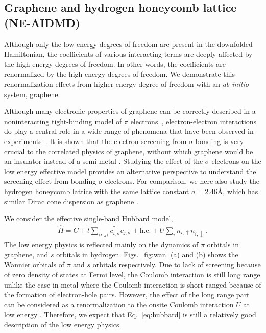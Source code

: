 %
\subsection{Graphene and hydrogen honeycomb lattice (NE-AIDMD)}
Although only the low energy degrees of freedom are present in the downfolded Hamiltonian, the coefficients of various interacting terms are deeply affected by the high energy degrees of freedom. In other words, the coefficients are renormalized by the high energy degrees of freedom. We demonstrate this renormalization effects from higher energy degree of freedom with an \textit{ab initio} system, graphene. 

Although many electronic properties of graphene can be correctly described in a noninteracting tight-binding model of $\pi$ electrons~\cite{Castro2009}, electron-electron interactions do play a central role in a wide range of phenomena that have been observed in experiments~\cite{Kotov2012}. It is shown that the electron screening from $\sigma$ bonding is very crucial to the correlated physics of graphene, without which graphene would be an insulator instead of a semi-metal \cite{Zheng2016}. Studying the effect of the $\sigma$ electrons on the low energy effective model provides an alternative perspective to understand the screening effect from bonding $\sigma$ electrons. For comparison, we here also study the hydrogen honeycomb lattice with the same lattice constant $a=2.46$\AA, which has similar Dirac cone dispersion as graphene \cite{Zheng2016}. 

 We consider the effective single-band Hubbard model, 
\begin{eqnarray}\label{eq:hubbard}
\hat{H} = C + t\sum_{\langle i,j\rangle}c_{i, \sigma}^\dagger c_{j, \sigma} + \text{h.c.} + U\sum_{i}n_{i, \uparrow}n_{i, \downarrow}\,. 
\end{eqnarray}
The low energy physics is reflected mainly on the dynamics of $\pi$ orbitals in graphene, and $s$ orbitals in hydrogen. Figs.~\ref{fig:wan} (a) and (b) shows the Wannier orbitals of $\pi$ and $s$ orbitals respectively. Due to lack of screening because of zero density of states at Fermi level, the Coulomb interaction is still long range unlike the case in metal where the Coulomb interaction is short ranged because of the formation of electron-hole pairs. However, the effect of the long range part can be considered as a renormalization to the onsite Coulomb interaction $U$ at low energy \cite{Schuler2013, Changlani2015}. Therefore, we expect that Eq.~\eqref{eq:hubbard} is still a relatively good description of the low energy physics. 

